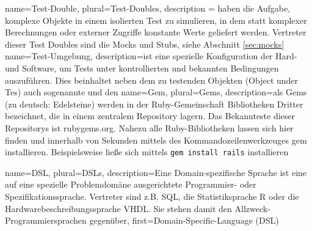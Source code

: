 
 {
  name={Test-Double},
  plural={Test-Doubles},
  description = {haben die Aufgabe, komplexe Objekte in einem isolierten Test zu simulieren, in dem statt komplexer Berechnungen oder externer Zugriffe konstante Werte geliefert werden. Vertreter dieser Test Doubles sind die Mocks und Stubs, siehe Abschnitt
 \ref{sec:mocks}}
}
 {
  name={Test-Umgebung},
  description={ist eine spezielle Konfiguration der Hard- und Software, um Tests unter kontrollierten und bekannten Bedingungen auszuführen. Dies beinhaltet neben dem zu testenden Objekten (Object under Tes) auch sogenannte  und den }
}
 {
  name={Gem},
  plural={Gems},
  description={als Gems (zu deutsch: Edelsteine) werden in der Ruby-Gemeinschaft Bibliotheken Dritter bezeichnet, die in einem zentralem Repository lagern. Das Bekannteste dieser Repositorys ist rubygems.org. Nahezu alle Ruby-Bibliotheken lassen sich hier finden und innerhalb von Sekunden mittels des Kommandozeilenwerkzeuges gem installieren. Beispielsweise ließe sich  mittels \texttt{gem install rails} installieren}
}

 {
  name={DSL},
  plural={DSLs},
  description={Eine Domain-spezifische Sprache ist eine auf eine spezielle Problemdomäne ausgerichtete Programmier- oder Spezifikationssprache. Vertreter sind z.B. SQL, die Statistiksprache R oder die Hardwarebeschreibungssprache VHDL. Sie stehen damit den Allzweck-Programmiersprachen gegenüber},
  first={Domain-Specific-Language (DSL)}
}


